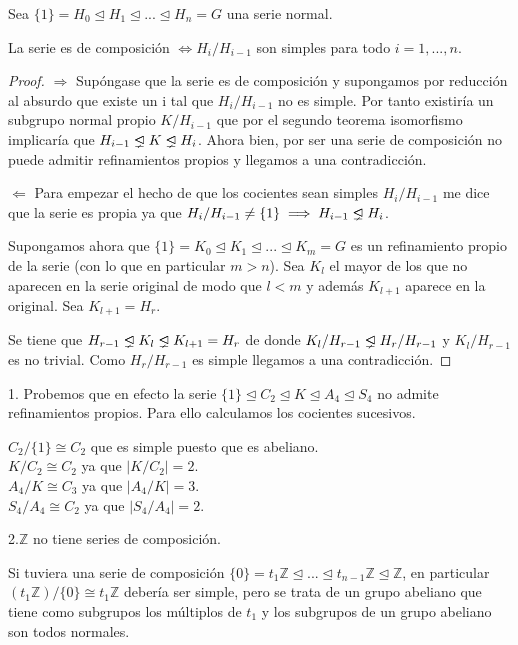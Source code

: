 \begin{theorem}
Sea $\{1\} = H_0 \trianglelefteq H_1 \trianglelefteq ... \trianglelefteq H_n = G$ una serie normal. 

La serie es de composición $\iff H_i/H_{i-1}$ son simples para todo $i = 1,...,n$.
\end{theorem}
\begin{proof}
$\Rightarrow$ Supóngase que la serie es de composición y supongamos por reducción al absurdo que existe un i tal que $H_i/H_{i-1}$ no es simple. Por tanto existiría un subgrupo normal propio $K/H_{i-1}$ que por el segundo teorema isomorfismo implicaría que $H_{i-1} \propernormal K \propernormal H_{i}$. Ahora bien, por ser una serie de composición no puede admitir refinamientos propios y llegamos a una contradicción.

$\Leftarrow$ Para empezar el hecho de que los cocientes sean simples $H_i/H_{i-1}$ me dice que la serie es propia ya que $H_i/H_{i-1} \neq \{1\} \implies H_{i-1} \propernormal H_i$.

Supongamos ahora que $\{1\} = K_0 \trianglelefteq K_1 \trianglelefteq ... \trianglelefteq K_m = G$ es un refinamiento propio de la serie (con lo que en particular $m > n$). Sea $K_l$ el mayor de los que no aparecen en la serie original de modo que $l < m$ y además $K_{l+1}$ aparece en la original. Sea $K_{l+1} = H_r$. 

Se tiene que $H_{r-1} \propernormal K_l \propernormal K_{l+1} = H_r$ de donde $K_l/H_{r-1} \propernormal H_r/H_{r-1}$ y $K_l/H_{r-1}$ es no trivial. Como $H_r/H_{r-1}$ es simple llegamos a una contradicción.
\end{proof}

\begin{example}
1. Probemos que en efecto la serie $\{1\} \trianglelefteq C_2 \trianglelefteq K \trianglelefteq A_4 \trianglelefteq S_4$ no admite refinamientos propios. Para ello calculamos los cocientes sucesivos. 

$C_2/\{1\} \cong C_2$ que es simple puesto que es abeliano.\\
$K/C_2 \cong C_2$ ya que $|K/C_2| = 2$.\\
$A_4/K \cong C_3$ ya que $|A_4/K| = 3$.\\
$S_4/A_4 \cong C_2$ ya que $|S_4/A_4| = 2$.
 
2.$\mathbb{Z}$ no tiene series de composición.

Si tuviera una serie de composición $\{0\} = t_1\mathbb{Z} \trianglelefteq ... \trianglelefteq t_{n-1}\mathbb{Z} \trianglelefteq \mathbb{Z}$, en particular $(t_1\mathbb{Z})/\{0\} \cong t_1\mathbb{Z}$ debería ser simple, pero se trata de un grupo abeliano que tiene como subgrupos los múltiplos de $t_1$ y los subgrupos de un grupo abeliano son todos normales.
\end{example}

